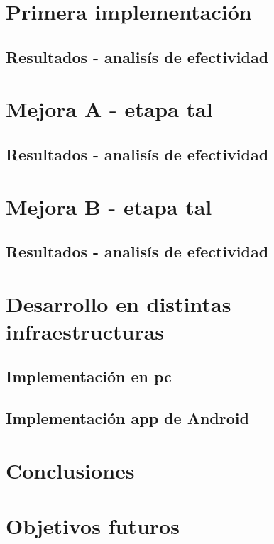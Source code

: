 \documentclass[conference]{IEEEtran}
\begin{document}
\section{Primera implementación}

\subsection{Resultados - analisís de efectividad}

\section{Mejora A - etapa tal}

\subsection{Resultados - analisís de efectividad}

\section{Mejora B - etapa tal}

\subsection{Resultados - analisís de efectividad}

\section{Desarrollo en distintas infraestructuras}

\subsection{Implementación en pc}

\subsection{Implementación app de Android}

\section{Conclusiones}

\section{Objetivos futuros}
\end{document}
